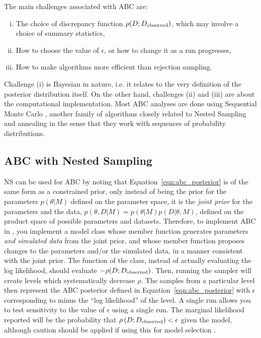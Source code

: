 \documentclass[article, nojss]{jss}
\begin{document}
The main challenges associated with ABC are:
\begin{enumerate}[(i)]
\item The choice of discrepancy function $\rho(D; D_{\rm observed})$, which
may involve a choice of summary statistics,
\item How to choose the value of $\epsilon$, or how to change it as a run
progresses,
\item How to make algorithms more efficient than rejection sampling.
\end{enumerate}
Challenge (i) is Bayesian in nature, i.e. it relates to the very
definition of the posterior distribution itself.
On the other hand, challenges (ii) and (iii) are about the computational
implementation. Most ABC analyses are done using Sequential Monte Carlo
\citep[SMC; ][]{del2012adaptive}, another family of algorithms closely related
to Nested Sampling and annealing in the sense that they work with
sequences of probability distributions.

\subsection{ABC with Nested Sampling}
NS can be used for ABC by noting that Equation~\ref{eqn:abc_posterior}
is of the same form as a constrained prior, only instead of being the prior
for the parameters $p(\theta | M)$ defined on the parameter space, it is
the {\em joint prior} for the parameters and the data,
$p(\theta, D |M) = p(\theta | M)p(D | \theta, M)$, defined on the product
space of possible parameters and datasets. Therefore, to implement
ABC in , you implement a model class
whose  member function generates parameters {\em and simulated
data} from the joint prior, and whose  member function
proposes changes to the parameters and/or the simulated data, in a
manner consistent with the joint prior. The  function
of the class, instead of actually evaluating the log likelihood, should
evaluate $-\rho(D; D_{\rm observed})$. Then, running the sampler
will create levels which systematically decrease $\rho$. The samples from
a particular level then represent the ABC posterior defined in
Equation~\ref{eqn:abc_posterior} with $\epsilon$ corresponding to minus
the ``log likelihood'' of the level.
A single  run allows you to test sensitivity
to the value of $\epsilon$ using a single run.
The marginal likelihood reported will be
the probability that $\rho\left(D; D_{\rm observed}\right) < \epsilon$
given the model, although caution should be applied if
using this for model selection \citep{robert2011lack}.
\end{document}
